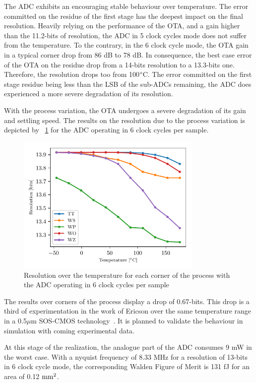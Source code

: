 The ADC exhibits an encouraging stable behaviour over temperature. The error committed on the residue of the first stage has the deepest impact on the final resolution. Heavily relying on the performance of the OTA, and a gain higher than the 11.2-bits of resolution, the ADC in 5 clock cycles mode does not suffer from the temperature. To the contrary, in the 6 clock cycle mode, the OTA gain in a typical corner drop from 86 dB to 78 dB. In consequence, the best case error of the OTA on the residue drop from a 14-bits resolution to a 13.3-bits one. Therefore, the resolution drops too from 100$\degree$C. The error committed on the first stage residue being less than the LSB of the sub-ADCs remaining, the ADC does experienced a more severe degradation of its resolution.

With the process variation, the OTA undergoes a severe degradation of its gain and settling speed. The results on the resolution due to the process variation is depicted by \figurename~\ref{fig:adc-res-schematic-temp-corners} for the ADC operating in 6 clock cycles per sample.

\begin{figure}[htp]
    \centering
    \includegraphics[width=0.8\textwidth]{Chapter5/Figs/preliminary/adc_real_ota_osr6_temp-corners.pdf}
    \caption{Resolution over the temperature for each corner of the process with the ADC operating in 6 clock cycles per sample}
    \label{fig:adc-res-schematic-temp-corners}
\end{figure}

The results over corners of the process display a drop of 0.67-bits. This drop is a third of experimentation in the work of Ericson over the same temperature range in a 0.5$\mu$m SOS-CMOS technology~\cite{Ericson2004}. It is planned to validate the behaviour in simulation with coming experimental data.

At this stage of the realization, the analogue part of the ADC consumes 9 mW in the worst case. With a nyquist frequency of 8.33 MHz for a resolution of 13-bits in 6 clock cycle mode, the corresponding Walden Figure of Merit is 131 fJ for an area of 0.12 $\rm mm^2$.